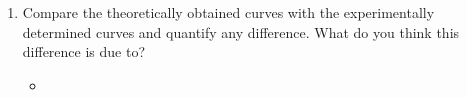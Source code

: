 \documentclass{article}
\begin{document}

\newpage
\begin{center}
  \begin{enumerate}
    \item Compare the theoretically obtained curves with the experimentally determined curves and quantify any difference. What do you think this difference is due to?
    \begin{itemize}
      \item
    \end{itemize}
  \end{enumerate}
\end{center}
\end{document}
